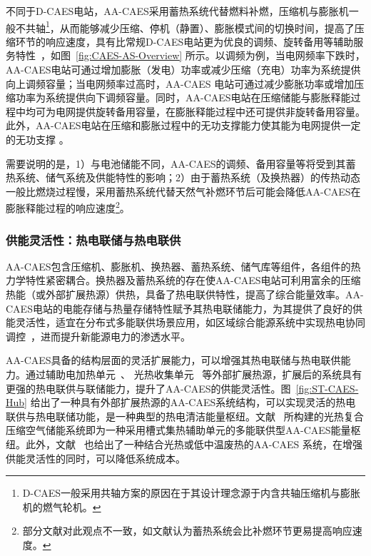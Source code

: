 不同于D-CAES电站，AA-CAES采用蓄热系统代替燃料补燃，压缩机与膨胀机一般不共轴\footnote{D-CAES一般采用共轴方案的原因在于其设计理念源于内含共轴压缩机与膨胀机的燃气轮机。}，从而能够减少压缩、停机（静置）、膨胀模式间的切换时间，提高了压缩环节的响应速度\cite{CAES-Review-18-Rui-operation}，具有比常规D-CAES电站更为优良的调频、旋转备用等辅助服务特性~\cite{ESS-Model-14}，如图~\ref{fig:CAES-AS-Overview} 所示。以调频为例，当电网频率下跌时，AA-CAES电站可通过增加膨胀（发电）功率或减少压缩（充电）功率为系统提供向上调频容量；当电网频率过高时，AA-CAES 电站可通过减少膨胀功率或增加压缩功率为系统提供向下调频容量\cite{CAES-Review-18-Rui-operation}。同时，AA-CAES电站在压缩储能与膨胀释能过程中均可为电网提供旋转备用容量，在膨胀释能过程中还可提供非旋转备用容量\cite{CAES-Review-18-Rui-operation}。此外，AA-CAES电站在压缩和膨胀过程中的无功支撑能力使其能为电网提供一定的无功支撑 \cite{CAES-Reactive-18-LGK}。

需要说明的是，1）与电池储能不同，AA-CAES的调频、备用容量等将受到其蓄热系统、储气系统及供能特性的影响\cite{AA-CAES-Reserve-LYW-18}；2）由于蓄热系统（及换热器）的传热动态一般比燃烧过程慢，采用蓄热系统代替天然气补燃环节后可能会降低AA-CAES在膨胀释能过程的响应速度\footnote{部分文献对此观点不一致，如文献认为蓄热系统会比补燃环节更易提高响应速度。}\cite{CAES-Review-18-Rui-operation}。

\subsubsection{供能灵活性：热电联储与热电联供}
\label{sec:flexibility-poly-generation}
AA-CAES包含压缩机、膨胀机、换热器、蓄热系统、储气库等组件，各组件的热力学特性紧密耦合\cite{CAES-Review-18-Rui-operation}。换热器及蓄热系统的存在使AA-CAES电站可利用富余的压缩热能（或外部扩展热源）供热，具备了热电联供特性，提高了综合能量效率\cite{CAES-Review-18-Rui-operation}。AA-CAES电站的电能存储与热量存储特性赋予其热电联储能力，为其提供了良好的供能灵活性，适宜在分布式多能联供场景应用，如区域综合能源系统中实现热电协同调控~\cite{Trigen-mCAES-15,CAES-Alberta-14}，进而提升新能源电力的渗透水平。

AA-CAES具备的结构层面的灵活扩展能力，可以增强其热电联储与热电联供能力。通过辅助电加热单元~\cite{Hybrid-CAES-14}、 光热收集单元~\cite{EH-CSP-17-Rui,Wind-Solar-CAES-12-Xu} 等外部扩展热源，扩展后的系统具有更强的热电联供与联储能力，提升了AA-CAES的供能灵活性。图~\ref{fig:ST-CAES-Hub} 给出了一种具有外部扩展热源的AA-CAES系统结构，可以实现灵活的热电联供与热电联储功能，是一种典型的热电清洁能量枢纽\cite{CAES-Review-18-Rui-operation}。文献~ 所构建的光热复合压缩空气储能系统即为一种采用槽式集热辅助单元的多能联供型AA-CAES能量枢纽。此外，文献~ 也给出了一种结合光热或低中温废热的AA-CAES 系统，在增强供能灵活性的同时，可以降低系统成本。


